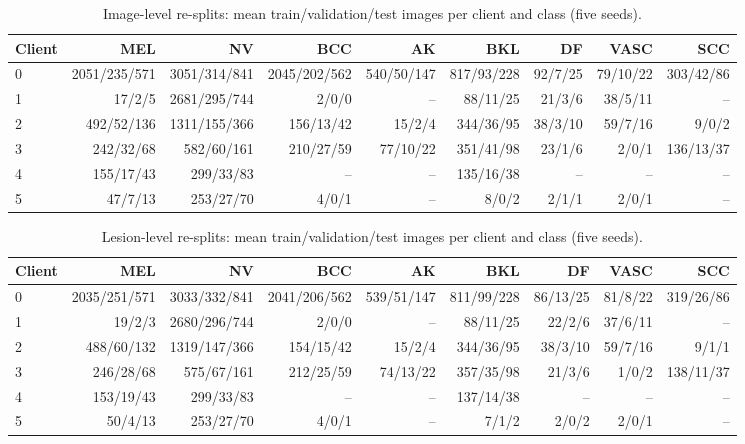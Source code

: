 \documentclass[10pt]{article}
\begin{document}
\begin{table}[!htbp]
\centering
\scriptsize
\caption{Image-level re-splits: mean train/validation/test images per client and class (five seeds).}
\label{tab:s1splitimage}
\begin{tabular}{@{}lrrrrrrrr@{}}
\toprule
Client & MEL & NV & BCC & AK & BKL & DF & VASC & SCC \\
\midrule
0 & 2051/235/571 & 3051/314/841 & 2045/202/562 & 540/50/147 & 817/93/228 & 92/7/25 & 79/10/22 & 303/42/86 \\
1 & 17/2/5 & 2681/295/744 & 2/0/0 & -- & 88/11/25 & 21/3/6 & 38/5/11 & -- \\
2 & 492/52/136 & 1311/155/366 & 156/13/42 & 15/2/4 & 344/36/95 & 38/3/10 & 59/7/16 & 9/0/2 \\
3 & 242/32/68 & 582/60/161 & 210/27/59 & 77/10/22 & 351/41/98 & 23/1/6 & 2/0/1 & 136/13/37 \\
4 & 155/17/43 & 299/33/83 & -- & -- & 135/16/38 & -- & -- & -- \\
5 & 47/7/13 & 253/27/70 & 4/0/1 & -- & 8/0/2 & 2/1/1 & 2/0/1 & -- \\
\bottomrule
\end{tabular}
\end{table}
\begin{table}[!htbp]
\centering
\scriptsize
\caption{Lesion-level re-splits: mean train/validation/test images per client and class (five seeds).}
\label{tab:s1splitlesion}
\begin{tabular}{@{}lrrrrrrrr@{}}
\toprule
Client & MEL & NV & BCC & AK & BKL & DF & VASC & SCC \\
\midrule
0 & 2035/251/571 & 3033/332/841 & 2041/206/562 & 539/51/147 & 811/99/228 & 86/13/25 & 81/8/22 & 319/26/86 \\
1 & 19/2/3 & 2680/296/744 & 2/0/0 & -- & 88/11/25 & 22/2/6 & 37/6/11 & -- \\
2 & 488/60/132 & 1319/147/366 & 154/15/42 & 15/2/4 & 344/36/95 & 38/3/10 & 59/7/16 & 9/1/1 \\
3 & 246/28/68 & 575/67/161 & 212/25/59 & 74/13/22 & 357/35/98 & 21/3/6 & 1/0/2 & 138/11/37 \\
4 & 153/19/43 & 299/33/83 & -- & -- & 137/14/38 & -- & -- & -- \\
5 & 50/4/13 & 253/27/70 & 4/0/1 & -- & 7/1/2 & 2/0/2 & 2/0/1 & -- \\
\bottomrule
\end{tabular}
\end{table}
\end{document}
